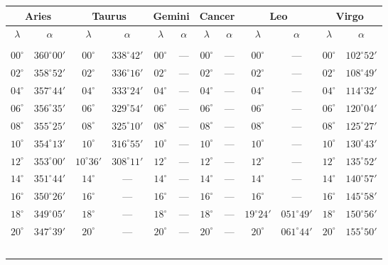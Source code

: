 \clearpage
\begin{table}[!h]
\vspace{0.25cm}
\centering
{\scriptsize \begin{tabular}{cc|cc|cc|cc|cc|cc}
\multicolumn{2}{c}{Aries}\vline & \multicolumn{2}{c}{Taurus} \vline& \multicolumn{2}{c}{Gemini} \vline& \multicolumn{2}{c}{Cancer}\vline &
\multicolumn{2}{c}{Leo}\vline & \multicolumn{2}{c}{Virgo}\\\hline
$\lambda$& $\alpha$& $\lambda$& $\alpha$& $\lambda$& $\alpha$& $\lambda$& $\alpha$& $\lambda$& $\alpha$& $\lambda$& $\alpha$\\\hline
&&&&&&&&&&&\\[-2ex]
$00^\circ$ & $360^\circ00'$ & $00^\circ$ & $338^\circ42'$ & $00^\circ$ & --- & $00^\circ$ & --- & $00^\circ$ & --- & $00^\circ$ & $102^\circ52'$\\
$02^\circ$ & $358^\circ52'$ & $02^\circ$ & $336^\circ16'$ & $02^\circ$ & --- & $02^\circ$ & --- & $02^\circ$ & --- & $02^\circ$ & $108^\circ49'$\\
$04^\circ$ & $357^\circ44'$ & $04^\circ$ & $333^\circ24'$ & $04^\circ$ & --- & $04^\circ$ & --- & $04^\circ$ & --- & $04^\circ$ & $114^\circ32'$\\
$06^\circ$ & $356^\circ35'$ & $06^\circ$ & $329^\circ54'$ & $06^\circ$ & --- & $06^\circ$ & --- & $06^\circ$ & --- & $06^\circ$ & $120^\circ04'$\\
$08^\circ$ & $355^\circ25'$ & $08^\circ$ & $325^\circ10'$ & $08^\circ$ & --- & $08^\circ$ & --- & $08^\circ$ & --- & $08^\circ$ & $125^\circ27'$\\
$10^\circ$ & $354^\circ13'$ & $10^\circ$ & $316^\circ55'$ & $10^\circ$ & --- & $10^\circ$ & --- & $10^\circ$ & --- & $10^\circ$ & $130^\circ43'$\\
$12^\circ$ & $353^\circ00'$ & $10^\circ36'$ &$308^\circ11'$  & $12^\circ$ & --- & $12^\circ$ & --- & $12^\circ$ & --- & $12^\circ$ & $135^\circ52'$\\
$14^\circ$ & $351^\circ44'$ & $14^\circ$ & --- & $14^\circ$ & --- & $14^\circ$ & --- & $14^\circ$ & --- & $14^\circ$ & $140^\circ57'$\\
$16^\circ$ & $350^\circ26'$ & $16^\circ$ & --- & $16^\circ$ & --- & $16^\circ$ & --- & $16^\circ$ & --- & $16^\circ$ & $145^\circ58'$\\
$18^\circ$ & $349^\circ05'$ & $18^\circ$ & --- & $18^\circ$ & --- & $18^\circ$ & --- & $19^\circ$$24'$ & $051^\circ49'$& $18^\circ$ & $150^\circ56'$\\
$20^\circ$ & $347^\circ39'$ & $20^\circ$ & --- & $20^\circ$ & --- & $20^\circ$ & --- & $20^\circ$ & $061^\circ44'$ & $20^\circ$ & $155^\circ50'$\\
$$
\end{tabular}}
\end{table}
